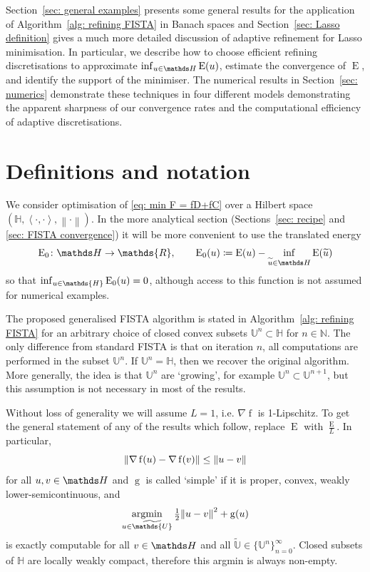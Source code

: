 \documentclass[smallextended]{svjour3}
\let\F\mathds\let\C\mathcal\newcommand{\R}{\F{R}}\newcommand{\A}{\tens{A}}
\newcommand{\norm}[1]{{\left\lVert #1 \right\rVert}}
\newcommand{\IP}[2]{\left\langle #1,#2 \right\rangle}
\newcommand{\op}[1]{\operatorname{#1}}
\newcommand{\1}{\F{1}}
\DeclareMathOperator*{\argmin}{argmin}
\newcommand{\Emin}[1][\var0]{\inf_{#1\in\F H}\op{E}(#1)}
\newcommand*{\var}[1]{%
	\IfEqCase{#1}{%
		{0}{u}%
		{1}{v}%
		{2}{w}%
	}[u#1]%
}
\begin{document}
	Section~\ref{sec: general examples} presents some general results for the application of Algorithm~\ref{alg: refining FISTA} in Banach spaces and Section~\ref{sec: Lasso definition} gives a much more detailed discussion of adaptive refinement for Lasso minimisation. In particular, we describe how to choose efficient refining discretisations to approximate $\Emin$, estimate the convergence of $\op{E}$, and identify the support of the minimiser. The numerical results in Section~\ref{sec: numerics} demonstrate these techniques in four different models demonstrating the apparent sharpness of our convergence rates and the computational efficiency of adaptive discretisations.
	
	
	\section{Definitions and notation}\label{sec: prelims}
	We consider optimisation of \eqref{eq: min F = fD+fC} over a Hilbert space $(\F H,\IP\cdot\cdot,\norm\cdot)$. In the more analytical section (Sections~\ref{sec: recipe} and \ref{sec: FISTA convergence}) it will be more convenient to use the translated energy
	\begin{equation}
		\op{E}_0\colon\F H\to \R,\qquad \op{E}_0(\var0) \coloneqq \op{E}(\var0)-\Emin[\tilde{\var0}]
	\end{equation}
	so that $\inf_{\var0\in\F{H}}\op{E}_0(\var0) = 0$, although access to this function is not assumed for numerical examples.

	
	The proposed generalised FISTA algorithm is stated in Algorithm~\ref{alg: refining FISTA} for an arbitrary choice of closed convex subsets $\F{U}^n\subset \F H$ for $n\in\F N$. The only difference from standard FISTA is that on iteration $n$, all computations are performed in the subset $\F{U}^n$. If $\F{U}^n=\F H$, then we recover the original algorithm. More generally, the idea is that $\F{U}^n$ are `growing', for example $\F{U}^n\subset\F{U}^{n+1}$, but this assumption is not necessary in most of the results.
	
	Without loss of generality we will assume $L=1$, i.e. $\nabla\op{f}$ is 1-Lipschitz. To get the general statement of any of the results which follow, replace $\op{E}$ with $\frac{\op{E}}{L}$. In particular,
	\begin{equation}
		\norm{\nabla\op{f}(\var0)- \nabla\op{f}(\var1)} \leq \norm{\var0-\var1}
	\end{equation}
	for all $\var0,\var1\in\F H$ and $\op{g}$ is called `simple' if it is proper, convex, weakly lower-semicontinuous, and
	\begin{equation}
		\argmin_{\var0\in\tilde{\F{U}}}\tfrac12\norm{\var0-\var1}^2 + \op{g}(\var0)
	\end{equation}
	is exactly computable for all $\var1\in\F H$ and all $\tilde{\F{U}}\in\{\F{U}^n\}_{n=0}^\infty$. Closed subsets of $\F H$ are locally weakly compact, therefore this argmin is always non-empty.
	
\end{document}

